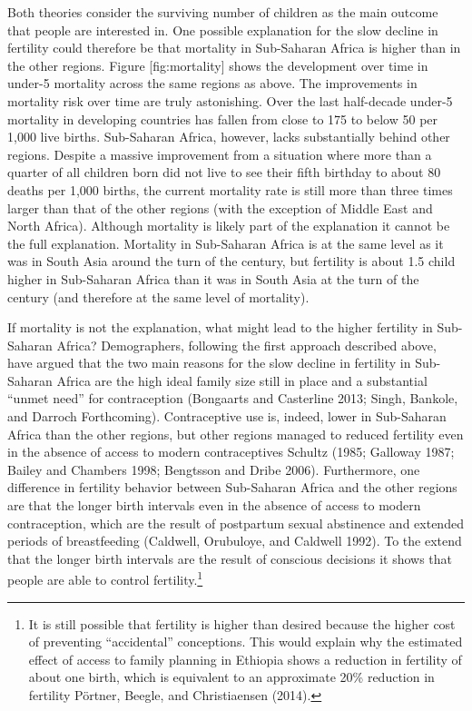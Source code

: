 \documentclass[]{article}
\begin{document}
Both theories consider the surviving number of children as the main outcome that people are interested in. One possible explanation for the slow decline in fertility could therefore be that mortality in Sub-Saharan Africa is higher than in the other regions. Figure {[}fig:mortality{]} shows the development over time in under-5 mortality across the same regions as above. The improvements in mortality risk over time are truly astonishing. Over the last half-decade under-5 mortality in developing countries has fallen from close to 175 to below 50 per 1,000 live births. Sub-Saharan Africa, however, lacks substantially behind other regions. Despite a massive improvement from a situation where more than a quarter of all children born did not live to see their fifth birthday to about 80 deaths per 1,000 births, the current mortality rate is still more than three times larger than that of the other regions (with the exception of Middle East and North Africa). Although mortality is likely part of the explanation it cannot be the full explanation. Mortality in Sub-Saharan Africa is at the same level as it was in South Asia around the turn of the century, but fertility is about 1.5 child higher in Sub-Saharan Africa than it was in South Asia at the turn of the century (and therefore at the same level of mortality).

If mortality is not the explanation, what might lead to the higher fertility in Sub-Saharan Africa? Demographers, following the first approach described above, have argued that the two main reasons for the slow decline in fertility in Sub-Saharan Africa are the high ideal family size still in place and a substantial ``unmet need'' for contraception (Bongaarts and Casterline 2013; Singh, Bankole, and Darroch Forthcoming). Contraceptive use is, indeed, lower in Sub-Saharan Africa than the other regions, but other regions managed to reduced fertility even in the absence of access to modern contraceptives Schultz (1985; Galloway 1987; Bailey and Chambers 1998; Bengtsson and Dribe 2006). Furthermore, one difference in fertility behavior between Sub-Saharan Africa and the other regions are that the longer birth intervals even in the absence of access to modern contraception, which are the result of postpartum sexual abstinence and extended periods of breastfeeding (Caldwell, Orubuloye, and Caldwell 1992). To the extend that the longer birth intervals are the result of conscious decisions it shows that people are able to control fertility.\footnote{It is still possible that fertility is higher than desired because the higher cost of preventing ``accidental'' conceptions. This would explain why the estimated effect of access to family planning in Ethiopia shows a reduction in fertility of about one birth, which is equivalent to an approximate 20\% reduction in fertility Pörtner, Beegle, and Christiaensen (2014).}
\end{document}

